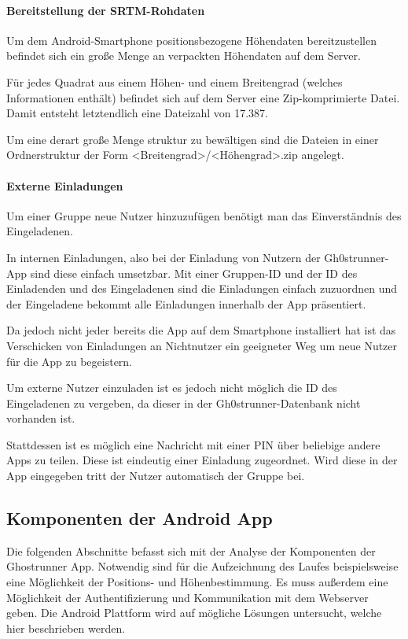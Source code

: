 \paragraph{Bereitstellung der SRTM-Rohdaten}
Um dem Android-Smartphone positionsbezogene Höhendaten bereitzustellen befindet sich ein große Menge an verpackten Höhendaten auf dem Server.

Für jedes Quadrat aus einem Höhen- und einem Breitengrad (welches Informationen enthält) befindet sich auf dem Server eine Zip-komprimierte Datei. Damit entsteht letztendlich eine Dateizahl von 17.387.

Um eine derart große Menge struktur zu bewältigen sind die Dateien in einer Ordnerstruktur der Form <Breitengrad>/<Höhengrad>.zip angelegt.
\paragraph{Externe Einladungen}
Um einer Gruppe neue Nutzer hinzuzufügen benötigt man das Einverständnis des Eingeladenen.

In internen Einladungen, also bei der Einladung von Nutzern der Gh0strunner-App sind diese einfach umsetzbar. Mit einer Gruppen-ID und der ID des Einladenden und des Eingeladenen sind die Einladungen einfach zuzuordnen und der Eingeladene bekommt alle Einladungen innerhalb der App präsentiert.

Da jedoch nicht jeder bereits die App auf dem Smartphone installiert hat ist das Verschicken von Einladungen an Nichtnutzer ein geeigneter Weg um neue Nutzer für die App zu begeistern.

Um externe Nutzer einzuladen ist es jedoch nicht möglich die ID des Eingeladenen zu vergeben, da dieser in der Gh0strunner-Datenbank nicht vorhanden ist.

Stattdessen ist es möglich eine Nachricht mit einer PIN über beliebige andere Apps zu teilen. Diese ist eindeutig einer Einladung zugeordnet. Wird diese in der App eingegeben tritt der Nutzer automatisch der Gruppe bei.
\subsection{Komponenten der Android App}
Die folgenden Abschnitte befasst sich mit der Analyse der Komponenten der Ghostrunner App. Notwendig sind für die Aufzeichnung des Laufes beispielsweise eine Möglichkeit der Positions- und Höhenbestimmung. Es muss außerdem eine Möglichkeit der Authentifizierung und Kommunikation mit dem Webserver geben. Die Android Plattform wird auf mögliche Lösungen untersucht, welche hier beschrieben werden.
